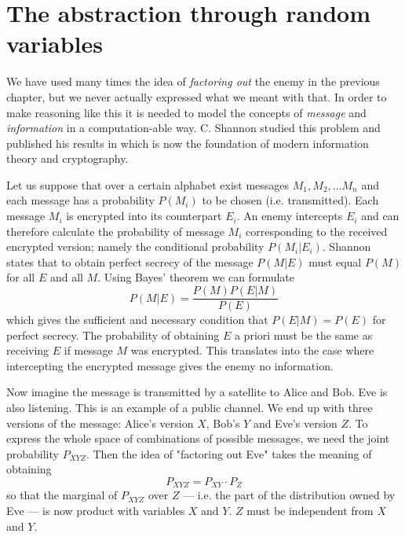 \section{The abstraction through random variables}
    We have used many times the idea of \textit{factoring out} the enemy in the previous chapter, but we never actually expressed what we meant with that.
    In order to make reasoning like this it is needed to model the concepts of \textit{message} and \textit{information} in a computation-able way.
    C. Shannon studied this problem and published his results in \cite{Shannon49} which is now the foundation of modern information theory and cryptography.
    
    Let us suppose that over a certain alphabet exist messages $M_1,M_2,\ldots M_n$ and each message has a probability $P(M_i)$ to be chosen (i.e. transmitted).
    Each message $M_i$ is encrypted into its counterpart $E_i$.
    An enemy intercepts $E_i$ and can therefore calculate the probability of message $M_i$ corresponding to the received encrypted version; namely the conditional probability $P(M_i|E_i)$.
    Shannon states that to obtain perfect secrecy of the message $P(M|E)$ must equal $P(M)$ for all $E$ and all $M$.
    Using Bayes' theorem we can formulate
    \begin{equation}
    	P(M|E) = \frac{P(M)P(E|M)}{P(E)}
    \end{equation}
    which gives the sufficient and necessary condition that $P(E|M)=P(E)$ for perfect secrecy. 
    The probability of obtaining $E$ a priori must be the same as receiving $E$ if message $M$ was encrypted.
    This translates into the case where intercepting the encrypted message gives the enemy no information. 
    
    Now imagine the message is transmitted by a satellite to Alice and Bob.
    Eve is also listening. This is an example of a public channel.
    We end up with three versions of the message\footnotemark : Alice's version $X$, Bob's $Y$ and Eve's version $Z$.
    To express the whole space of combinations of possible messages, we need the joint probability $P_{XYZ}$.
    Then the idea of "factoring out Eve" takes the meaning of obtaining 
    \begin{equation}
    	P_{XYZ} = P_{XY}\cdot P_Z
    \end{equation}
    so that the marginal of $P_{XYZ}$ over $Z$ --- i.e. the part of the distribution owned by Eve --- is now product with variables $X$ and $Y$. $Z$ must be independent from $X$ and $Y$.
    
